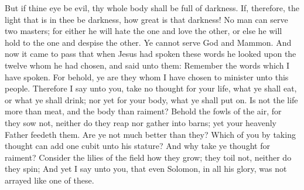 But if thine eye be evil, thy whole body shall be full of darkness. If, therefore, the light that is in thee be darkness, how great is that darkness!
\bverse \iffalse No man can serve two masters; for either he will hate the one and love the other, or else he will hold to the one and despise the other. Ye cannot serve God and Mammon. \fi
No man can serve two masters; for either he will hate the one and love the other, or else he will hold to the one and despise the other. Ye cannot serve God and Mammon.
\bverse \iffalse And now it came to pass that when Jesus had spoken these words he looked upon the twelve whom he had chosen, and said unto them: Remember the words which I have spoken. For behold, ye are they whom I have chosen to minister unto this people. Therefore I say unto you, take no thought for your life, what ye shall eat, or what ye shall drink; nor yet for your body, what ye shall put on. Is not the life more than meat, and the body than raiment? \fi
And now it came to pass that when Jesus had spoken these words he looked upon the twelve whom he had chosen, and said unto them: Remember the words which I have spoken. For behold, ye are they whom I have chosen to minister unto this people. Therefore I say unto you, take no thought for your life, what ye shall eat, or what ye shall drink; nor yet for your body, what ye shall put on. Is not the life more than meat, and the body than raiment?
\bverse \iffalse Behold the fowls of the air, for they sow not, neither do they reap nor gather into barns; yet your heavenly Father feedeth them. Are ye not much better than they? \fi
Behold the fowls of the air, for they sow not, neither do they reap nor gather into barns; yet your heavenly Father feedeth them. Are ye not much better than they?
\bverse \iffalse Which of you by taking thought can add one cubit unto his stature? \fi
Which of you by taking thought can add one cubit unto his stature?
\bverse \iffalse And why take ye thought for raiment? Consider the lilies of the field how they grow; they toil not, neither do they spin; \fi
And why take ye thought for raiment? Consider the lilies of the field how they grow; they toil not, neither do they spin;
\bverse \iffalse And yet I say unto you, that even Solomon, in all his glory, was not arrayed like one of these. \fi
And yet I say unto you, that even Solomon, in all his glory, was not arrayed like one of these.
\bverse \iffalse Wherefore, if God so clothe the grass of the field, which today is, and tomorrow is cast into the oven, even so will he clothe you, if ye are not of little faith. \fi
